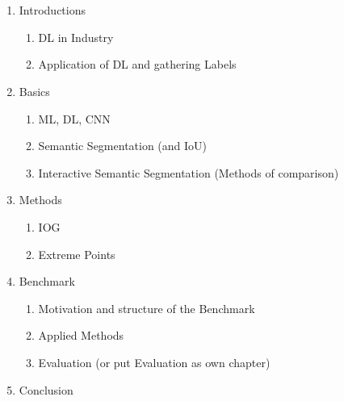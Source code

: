 \chapter{\abstractname}




\begin{enumerate}
	
	\item Introductions
	\begin{enumerate}
		\item DL in Industry
		\item Application of DL and gathering Labels
	\end{enumerate}
	
	\item Basics
	\begin{enumerate}
		\item ML, DL, CNN
		\item Semantic Segmentation (and IoU)
		\item Interactive Semantic Segmentation (Methods of comparison)
	\end{enumerate}
	
	
	\item Methods
	\begin{enumerate}
		\item IOG
		\item Extreme Points
	\end{enumerate}
	
	
	\item Benchmark
	\begin{enumerate}
		\item Motivation and structure of the Benchmark
		\item Applied Methods
		\item Evaluation (or put Evaluation as own chapter)
	\end{enumerate}
	
	
	\item Conclusion
	
\end{enumerate}

